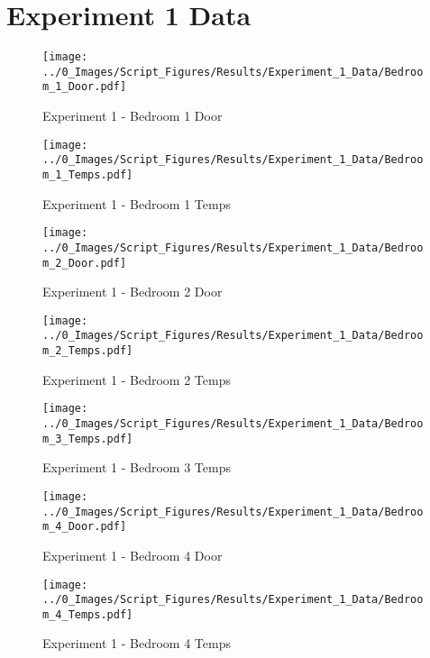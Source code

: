 \clearpage		\large
\section{Experiment 1 Data} \label{App:Exp1Results} 

	\begin{figure}[H]
		\centering
		\texttt{[image: ../0\_Images/Script\_Figures/Results/Experiment\_1\_Data/Bedroom\_1\_Door.pdf]}
		\caption[]{Experiment 1 - Bedroom 1 Door}
	\end{figure}
 

	\begin{figure}[H]
		\centering
		\texttt{[image: ../0\_Images/Script\_Figures/Results/Experiment\_1\_Data/Bedroom\_1\_Temps.pdf]}
		\caption[]{Experiment 1 - Bedroom 1 Temps}
	\end{figure}
 
	\clearpage

	\begin{figure}[H]
		\centering
		\texttt{[image: ../0\_Images/Script\_Figures/Results/Experiment\_1\_Data/Bedroom\_2\_Door.pdf]}
		\caption[]{Experiment 1 - Bedroom 2 Door}
	\end{figure}
 

	\begin{figure}[H]
		\centering
		\texttt{[image: ../0\_Images/Script\_Figures/Results/Experiment\_1\_Data/Bedroom\_2\_Temps.pdf]}
		\caption[]{Experiment 1 - Bedroom 2 Temps}
	\end{figure}
 
	\clearpage

	\begin{figure}[H]
		\centering
		\texttt{[image: ../0\_Images/Script\_Figures/Results/Experiment\_1\_Data/Bedroom\_3\_Temps.pdf]}
		\caption[]{Experiment 1 - Bedroom 3 Temps}
	\end{figure}
 

	\begin{figure}[H]
		\centering
		\texttt{[image: ../0\_Images/Script\_Figures/Results/Experiment\_1\_Data/Bedroom\_4\_Door.pdf]}
		\caption[]{Experiment 1 - Bedroom 4 Door}
	\end{figure}
 
	\clearpage

	\begin{figure}[H]
		\centering
		\texttt{[image: ../0\_Images/Script\_Figures/Results/Experiment\_1\_Data/Bedroom\_4\_Temps.pdf]}
		\caption[]{Experiment 1 - Bedroom 4 Temps}
	\end{figure}
 

